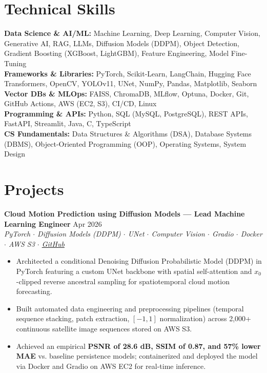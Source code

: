\documentclass[a4paper,10pt]{article}
\begin{document}
\section*{Technical Skills}
\textbf{Data Science \& AI/ML:} Machine Learning, Deep Learning, Computer Vision, Generative AI, RAG, LLMs, Diffusion Models (DDPM), Object Detection, Gradient Boosting (XGBoost, LightGBM), Feature Engineering, Model Fine-Tuning\\
\textbf{Frameworks \& Libraries:} PyTorch, Scikit-Learn, LangChain, Hugging Face Transformers, OpenCV, YOLOv11, UNet, NumPy, Pandas, Matplotlib, Seaborn\\
\textbf{Vector DBs \& MLOps:} FAISS, ChromaDB, MLflow, Optuna, Docker, Git, GitHub Actions, AWS (EC2, S3), CI/CD, Linux\\
\textbf{Programming \& APIs:} Python, SQL (MySQL, PostgreSQL), REST APIs, FastAPI, Streamlit, Java, C, TypeScript\\
\textbf{CS Fundamentals:} Data Structures \& Algorithms (DSA), Database Systems (DBMS), Object-Oriented Programming (OOP), Operating Systems, System Design


\section*{Projects}

\textbf{Cloud Motion Prediction using Diffusion Models --- Lead Machine Learning Engineer} \hfill Apr 2026\\
\textit{PyTorch $\cdot$ Diffusion Models (DDPM) $\cdot$ UNet $\cdot$ Computer Vision $\cdot$ Gradio $\cdot$ Docker $\cdot$ AWS S3 $\cdot$ \href{https://github.com/ThanujMaligi/Cloud-Motion-Prediction-Diffusion}{GitHub}}
\begin{itemize}
\item Architected a conditional Denoising Diffusion Probabilistic Model (DDPM) in PyTorch featuring a custom UNet backbone with spatial self-attention and $x_0$-clipped reverse ancestral sampling for spatiotemporal cloud motion forecasting.
\item Built automated data engineering and preprocessing pipelines (temporal sequence stacking, patch extraction, $[-1, 1]$ normalization) across 2,000+ continuous satellite image sequences stored on AWS S3.
\item Achieved an empirical \textbf{PSNR of 28.6 dB, SSIM of 0.87, and 57\% lower MAE} vs. baseline persistence models; containerized and deployed the model via Docker and Gradio on AWS EC2 for real-time inference.
\end{itemize}
\end{document}
